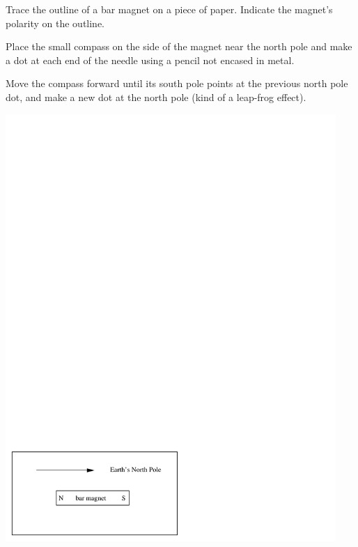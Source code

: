 \begin{enumerate}[labparts]
\begin{minipage}{0.5\textwidth}
\item Trace the outline of a bar magnet on a piece of paper.
 Indicate the magnet's polarity on the outline.
\item Place the small compass on the side of the magnet near the north pole
 and make a dot at each end of the needle using a pencil not encased in metal.
\item Move the compass forward until its south pole points at the previous
north pole dot, and make a new dot at the north pole (kind of a leap-frog 
effect).
\end{minipage}
\begin{minipage}{0.49\textwidth}
\hspace{0.05\textwidth}
\includegraphics[trim={0 0 3.5mm 0},clip,width=0.94\textwidth]{magnetism_field_perm_mag/magnetism_2_fig_1.pdf}
\end{minipage}



\end{enumerate}
